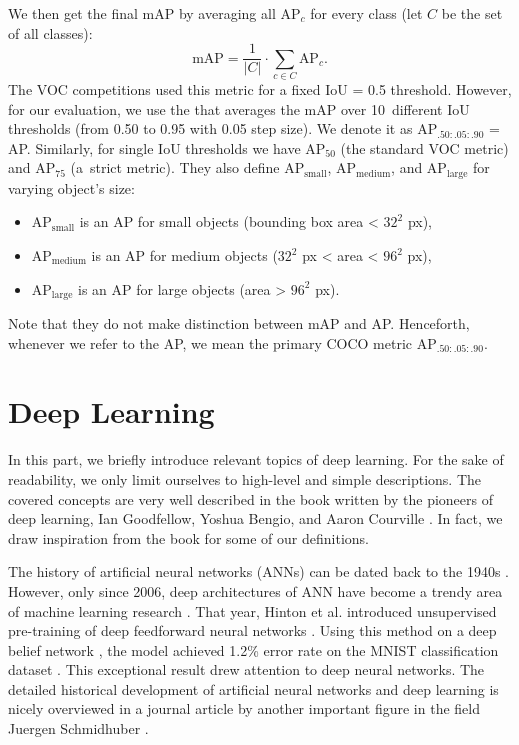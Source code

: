 We then get the final mAP by averaging all AP$_c$ for every class (let $C$ be
the set of all classes):
$$
    \text{mAP} = \frac{1}{\lvert C \rvert} \cdot \sum_{ c\in C} \text{AP}_c.
$$
The VOC competitions \cite{voc} used this metric for a fixed IoU = 0.5 threshold.
However, for our evaluation, we use the 
\cite{coco} that averages the mAP over 10~different IoU thresholds (from 0.50
to 0.95 with 0.05 step size). We denote it as AP$_{.50:.05:.90}$ = AP.
Similarly, for single IoU thresholds we have AP$_{50}$ (the standard VOC metric)
and AP$_{75}$ (a~strict metric). They also define AP$_\text{small}$,
AP$_\text{medium}$, and AP$_\text{large}$ for varying object's size:
\begin{itemize}
    \item AP$_\text{small}$ is an AP for small objects (bounding box area <
          $32^2$ px),
    \item AP$_\text{medium}$ is an AP for medium objects ($32^2$ px < area <
          $96^2$ px),
    \item AP$_\text{large}$ is an AP for large objects (area > $96^2$ px).
\end{itemize}
Note that they do not make distinction between mAP and AP. Henceforth, whenever
we refer to the AP, we mean the primary COCO metric AP$_{.50:.05:.90}$.

\section{Deep Learning}\label{deep_learning_chapter}
In this part, we briefly introduce relevant topics of deep learning. For the
sake of readability, we only limit ourselves to high-level and simple
descriptions. The covered concepts are very well described in the book written
by the pioneers of deep learning, Ian Goodfellow, Yoshua Bengio, and Aaron
Courville \cite{Goodfellow-et-al-2016}. In fact, we draw inspiration from the
book for some of our definitions.

The history of artificial neural networks (ANNs) can be dated back to the 1940s
\cite{McCulloch_1943}. However, only since 2006, deep architectures of ANN have
become a trendy area of machine learning research
\cite{DBLP:journals/corr/Schmidhuber14}. That year, Hinton et al. introduced
unsupervised pre-training of deep feedforward neural networks
\cite{hinton2006reducing}. Using this method on a deep belief network
\cite{DBN}, the model achieved 1.2\% error rate on the MNIST classification
dataset \cite{hinton2006fast, mnist}. This exceptional result drew attention
to deep neural networks. The detailed historical development of artificial
neural networks and deep learning is nicely overviewed in a journal article by
another important figure in the field Juergen Schmidhuber
\cite{DBLP:journals/corr/Schmidhuber14}.

